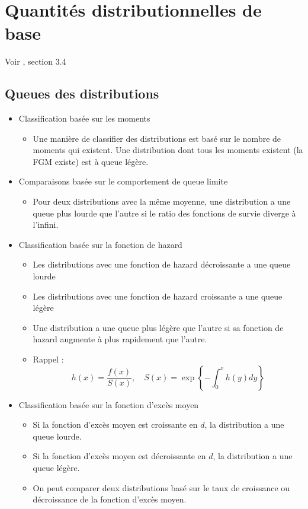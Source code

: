 \chapter{Quantités distributionnelles de base}
Voir \cite{klugman2012loss}, section 3.4
\section{Queues des distributions}

\begin{itemize}
	\item Classification basée sur les moments
	\begin{itemize}
		\item Une manière de classifier des distributions est basé sur le nombre de moments qui existent. Une distribution dont tous les moments existent (la FGM existe) est à queue légère. 
	\end{itemize}
	\item Comparaisons basée sur le comportement de queue limite
	\begin{itemize}
		\item Pour deux distributions avec la même moyenne, une distribution a une queue plus lourde que l'autre si le ratio des fonctions de survie diverge à l'infini. 
	\end{itemize}
	\item Classification basée sur la fonction de hazard
	\begin{itemize}
		\item Les distributions avec une fonction de hazard décroissante a une queue lourde
		\item Les distributions avec une fonction de hazard croissante a une queue légère
		\item Une distribution a une queue plus légère que l'autre si sa fonction de hazard augmente à plus rapidement que l'autre. 
		\item Rappel : 
		$$h(x) = \frac{f(x)}{S(x)}, \quad S(x) = \exp\left\{-\int_{0}^{x}h(y)dy\right\}$$
	\end{itemize}
	\item Classification basée sur la fonction d'excès moyen
	\begin{itemize}
		\item Si la fonction d'excès moyen est croissante en $d$, la distribution a une queue lourde. 
		\item Si la fonction d'excès moyen est décroissante en $d$, la distribution a une queue légère.
		\item On peut comparer deux distributions basé sur le taux de croissance ou décroissance de la fonction d'excès moyen. 

\end{itemize}
\end{itemize}
